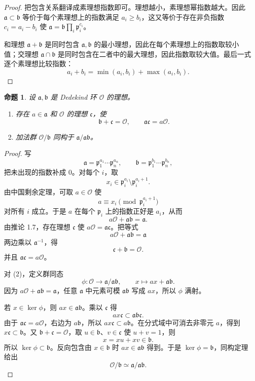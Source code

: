 \documentclass[11pt,a4paper,openany]{ctexbook}
\numberwithin{equation}{chapter}
\theoremstyle{plain}
\newtheorem{proposition}[theorem]{命题}
\theoremstyle{definition}
\theoremstyle{remark}
\begin{document}
\begin{proof}
把包含关系翻译成素理想指数即可。理想越小，素理想幂指数越大。因此 $\mathfrak a\subset\mathfrak b$ 等价于每个素理想上的指数满足 $a_i\ge b_i$，这又等价于存在非负指数 $c_i=a_i-b_i$ 使 $\mathfrak a=\mathfrak b\prod_i\mathfrak p_i^{c_i}$。

和理想 $\mathfrak a+\mathfrak b$ 是同时包含 $\mathfrak a,\mathfrak b$ 的最小理想，因此在每个素理想上的指数取较小值；交理想 $\mathfrak a\cap\mathfrak b$ 是同时包含在二者中的最大理想，因此指数取较大值。最后一式逐个素理想比较指数：
\[
a_i+b_i=\min(a_i,b_i)+\max(a_i,b_i).
\]
\end{proof}

\begin{proposition}
设 $\mathfrak a,\mathfrak b$ 是 Dedekind 环 $\mathcal O$ 的理想。
\begin{enumerate}[label=(\arabic*)]
\item 存在 $a\in\mathfrak a$ 和 $\mathcal O$ 的理想 $\mathfrak c$，使
\[
\mathfrak b+\mathfrak c=\mathcal O,\qquad \mathfrak a\mathfrak c=a\mathcal O.
\]
\item 加法群 $\mathcal O/\mathfrak b$ 同构于 $\mathfrak a/\mathfrak a\mathfrak b$。
\end{enumerate}
\end{proposition}

\begin{proof}
写
\[
\mathfrak a=\mathfrak p_1^{a_1}\cdots\mathfrak p_n^{a_n},\qquad
\mathfrak b=\mathfrak p_1^{b_1}\cdots\mathfrak p_n^{b_n},
\]
把未出现的指数补成 $0$。对每个 $i$，取
\[
x_i\in\mathfrak p_i^{a_i}\setminus\mathfrak p_i^{a_i+1}.
\]
由中国剩余定理，可取 $a\in\mathcal O$ 使
\[
a\equiv x_i\pmod{\mathfrak p_i^{a_i+1}}
\]
对所有 $i$ 成立。于是 $a$ 在每个 $\mathfrak p_i$ 上的指数正好是 $a_i$，从而
\[
a\mathcal O+\mathfrak a\mathfrak b=\mathfrak a.
\]
由推论 1.7，存在理想 $\mathfrak c$ 使 $a\mathcal O=\mathfrak a\mathfrak c$。把等式
\[
a\mathcal O+\mathfrak a\mathfrak b=\mathfrak a
\]
两边乘以 $\mathfrak a^{-1}$，得
\[
\mathfrak c+\mathfrak b=\mathcal O.
\]
并且 $\mathfrak a\mathfrak c=a\mathcal O$。

对 (2)，定义群同态
\[
\phi:\mathcal O\longrightarrow \mathfrak a/\mathfrak a\mathfrak b,\qquad
x\longmapsto ax+\mathfrak a\mathfrak b.
\]
因为 $a\mathcal O+\mathfrak a\mathfrak b=\mathfrak a$，任意 $\mathfrak a$ 中元素可模 $\mathfrak a\mathfrak b$ 写成 $ax$，所以 $\phi$ 满射。

若 $x\in\ker\phi$，则 $ax\in\mathfrak a\mathfrak b$。乘以 $\mathfrak c$ 得
\[
ax\mathfrak c\subset \mathfrak a\mathfrak b\mathfrak c.
\]
由于 $\mathfrak a\mathfrak c=a\mathcal O$，右边为 $a\mathfrak b$，所以 $ax\mathfrak c\subset a\mathfrak b$。在分式域中可消去非零元 $a$，得到 $x\mathfrak c\subset\mathfrak b$。又 $\mathfrak b+\mathfrak c=\mathcal O$，取 $u\in\mathfrak b$、$v\in\mathfrak c$ 使 $u+v=1$，则
\[
x=xu+xv\in\mathfrak b.
\]
所以 $\ker\phi\subset\mathfrak b$。反向包含由 $x\in\mathfrak b$ 时 $ax\in\mathfrak a\mathfrak b$ 得到。于是 $\ker\phi=\mathfrak b$，同构定理给出
\[
\mathcal O/\mathfrak b\simeq \mathfrak a/\mathfrak a\mathfrak b.
\]
\end{proof}
\end{document}

